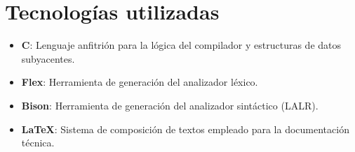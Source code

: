 \documentclass[12pt]{article}
\begin{document}
\section{Tecnologías utilizadas}
\begin{itemize}[label={-}]
    \item \textbf{C}: Lenguaje anfitrión para la lógica del compilador y estructuras de datos subyacentes.
    \item \textbf{Flex}: Herramienta de generación del analizador léxico.
    \item \textbf{Bison}: Herramienta de generación del analizador sintáctico (LALR).
    \item \textbf{LaTeX}: Sistema de composición de textos empleado para la documentación técnica.
\end{itemize}
\end{document}
